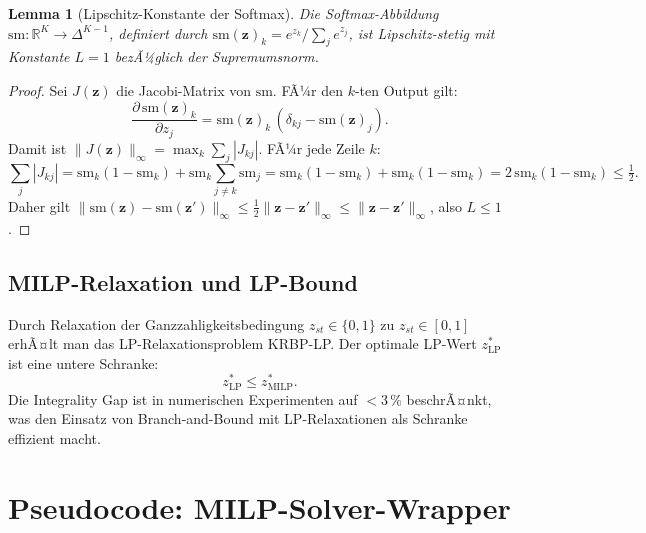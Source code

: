 ﻿\documentclass[12pt,a4paper]{article}
\theoremstyle{plain}
\newtheorem{lemma}[theorem]{Lemma}
\theoremstyle{definition}
\begin{document}
	\begin{lemma}[Lipschitz-Konstante der Softmax]
		Die Softmax-Abbildung $\mathrm{sm} : \mathbb{R}^K \to \Delta^{K-1}$,
		definiert durch $\mathrm{sm}(\mathbf{z})_k = e^{z_k} / \sum_j e^{z_j}$,
		ist Lipschitz-stetig mit Konstante $L = 1$ bezÃ¼glich der Supremumsnorm.
	\end{lemma}
	
	\begin{proof}
		Sei $J(\mathbf{z})$ die Jacobi-Matrix von $\mathrm{sm}$. FÃ¼r den
		$k$-ten Output gilt:
		\[
		\frac{\partial \,\mathrm{sm}(\mathbf{z})_k}{\partial z_j} =
		\mathrm{sm}(\mathbf{z})_k\,(\delta_{kj} - \mathrm{sm}(\mathbf{z})_j).
		\]
		Damit ist $\|J(\mathbf{z})\|_\infty = \max_k \sum_j |J_{kj}|$.
		FÃ¼r jede Zeile $k$:
		\[
		\sum_j |J_{kj}| = \mathrm{sm}_k(1 - \mathrm{sm}_k) +
		\mathrm{sm}_k\sum_{j \neq k} \mathrm{sm}_j
		= \mathrm{sm}_k(1 - \mathrm{sm}_k) + \mathrm{sm}_k(1 - \mathrm{sm}_k)
		= 2\,\mathrm{sm}_k(1-\mathrm{sm}_k) \leq \tfrac{1}{2}.
		\]
		Daher gilt $\|\mathrm{sm}(\mathbf{z}) - \mathrm{sm}(\mathbf{z}')\|_\infty
		\leq \tfrac{1}{2}\|\mathbf{z} - \mathbf{z}'\|_\infty \leq
		\|\mathbf{z} - \mathbf{z}'\|_\infty$, also $L \leq 1$.
	\end{proof}
	
	\subsection{MILP-Relaxation und LP-Bound}
	
	Durch Relaxation der Ganzzahligkeitsbedingung $z_{st} \in \{0,1\}$ zu
	$z_{st} \in [0,1]$ erhÃ¤lt man das LP-Relaxationsproblem KRBP-LP.
	Der optimale LP-Wert $z^*_{\mathrm{LP}}$ ist eine untere Schranke:
	\[
	z^*_{\mathrm{LP}} \leq z^*_{\mathrm{MILP}}.
	\]
	Die Integrality Gap ist in numerischen Experimenten auf $< 3\,\%$
	beschrÃ¤nkt, was den Einsatz von Branch-and-Bound mit LP-Relaxationen
	als Schranke effizient macht.
	
	\section{Pseudocode: MILP-Solver-Wrapper}
	
\end{document}
